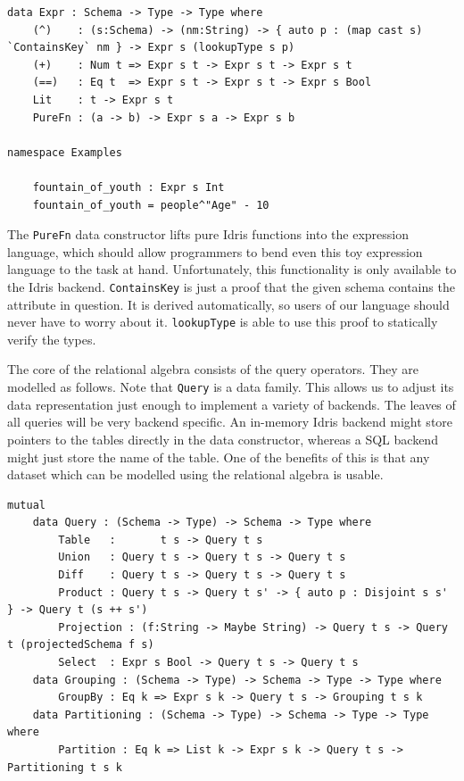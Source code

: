 \documentclass[12pt]{article}
\begin{document}
\begin{lstlisting}
data Expr : Schema -> Type -> Type where
    (^)    : (s:Schema) -> (nm:String) -> { auto p : (map cast s) `ContainsKey` nm } -> Expr s (lookupType s p)
    (+)    : Num t => Expr s t -> Expr s t -> Expr s t
    (==)   : Eq t  => Expr s t -> Expr s t -> Expr s Bool
    Lit    : t -> Expr s t
    PureFn : (a -> b) -> Expr s a -> Expr s b

namespace Examples

    fountain_of_youth : Expr s Int
    fountain_of_youth = people^"Age" - 10
\end{lstlisting}

The \texttt{PureFn} data constructor lifts pure Idris functions into the expression language, which should allow programmers to bend even this toy expression language to the task at hand.
Unfortunately, this functionality is only available to the Idris backend.
\texttt{ContainsKey} is just a proof that the given schema contains the attribute in question.
It is derived automatically, so users of our language should never have to worry about it.
\texttt{lookupType} is able to use this proof to statically verify the types.


The core of the relational algebra consists of the query operators.
They are modelled as follows.
Note that \texttt{Query} is a data family.
This allows us to adjust its data representation just enough to implement a variety of backends.
The leaves of all queries will be very backend specific.
An in-memory Idris backend might store pointers to the tables directly in the data constructor, whereas a SQL backend might just store the name of the table.
One of the benefits of this is that any dataset which can be modelled using the relational algebra is usable.

\begin{lstlisting}
mutual
    data Query : (Schema -> Type) -> Schema -> Type where
        Table   :       t s -> Query t s
        Union   : Query t s -> Query t s -> Query t s
        Diff    : Query t s -> Query t s -> Query t s
        Product : Query t s -> Query t s' -> { auto p : Disjoint s s' } -> Query t (s ++ s')
        Projection : (f:String -> Maybe String) -> Query t s -> Query t (projectedSchema f s)
        Select  : Expr s Bool -> Query t s -> Query t s
    data Grouping : (Schema -> Type) -> Schema -> Type -> Type where
        GroupBy : Eq k => Expr s k -> Query t s -> Grouping t s k
    data Partitioning : (Schema -> Type) -> Schema -> Type -> Type where
        Partition : Eq k => List k -> Expr s k -> Query t s -> Partitioning t s k
\end{lstlisting}
\end{document}
